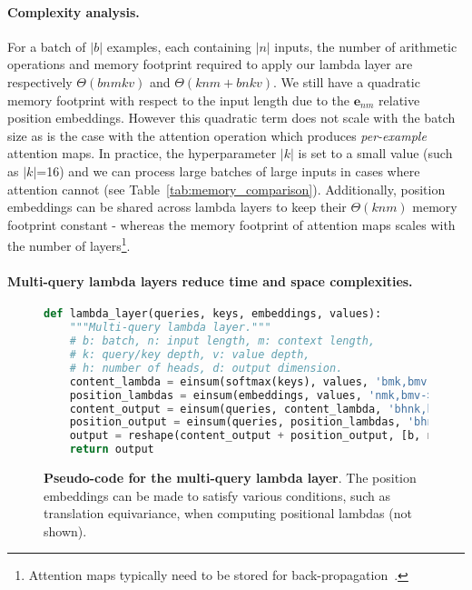 \documentclass{article} \usepackage{iclr2021_conference,times}
\begin{document}
\paragraph{Complexity analysis.}
For a batch of $|b|$ examples, each containing $|n|$ inputs, the number of arithmetic operations and memory footprint required to apply our lambda layer
are respectively $\Theta(bnmkv)$ and $\Theta(knm + bnkv)$.
We still have a quadratic memory footprint with respect to the input length due to the $\boldsymbol{e}_{nm}$ relative position embeddings.
However this quadratic term does not scale with the batch size as is the case with the attention operation which produces \emph{per-example} attention maps.
In practice, the hyperparameter $|k|$ is set to a small value (such as $|k|$=16) and we can process large batches of large inputs in cases where attention cannot (see Table~\ref{tab:memory_comparison}).
Additionally, position embeddings can be shared across lambda layers to keep their $\Theta(knm)$ memory footprint constant - whereas the memory footprint of attention maps scales with the number of layers\footnote{Attention maps typically need to be stored for back-propagation~\citep{kitaev2020reformer}.}.

\vspace{-0.1cm}
\paragraph{Multi-query lambda layers reduce time and space complexities.}
\begin{figure}[h]
\small
\begin{lstlisting}[language=python]
def lambda_layer(queries, keys, embeddings, values):
    """Multi-query lambda layer."""
    # b: batch, n: input length, m: context length,
    # k: query/key depth, v: value depth,
    # h: number of heads, d: output dimension.
    content_lambda = einsum(softmax(keys), values, 'bmk,bmv->bkv')
    position_lambdas = einsum(embeddings, values, 'nmk,bmv->bnkv')
    content_output = einsum(queries, content_lambda, 'bhnk,bkv->bnhv')
    position_output = einsum(queries, position_lambdas, 'bhnk,bnkv->bnhv')
    output = reshape(content_output + position_output, [b, n, d])
    return output
\end{lstlisting}
    \caption{
    \textbf{Pseudo-code for the multi-query lambda layer}.
    The position embeddings can be made to satisfy various conditions, such as translation equivariance, when computing positional lambdas (not shown).
    }
    \label{fig:lambda_layer_code}
    \vspace{-0.25cm}
\end{figure}
\end{document}
